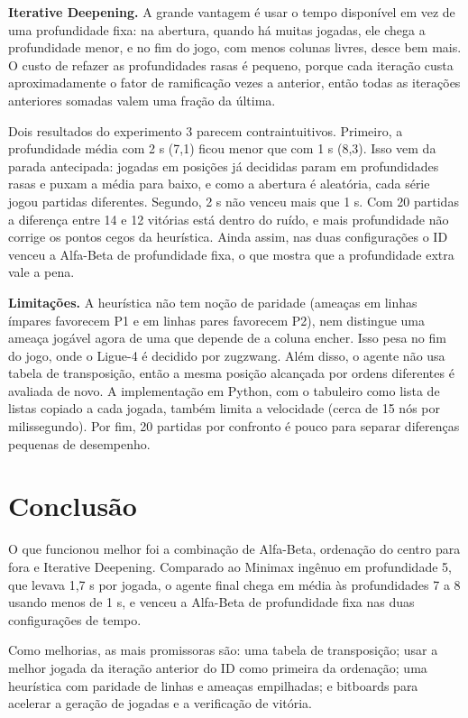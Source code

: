 \documentclass[letterpaper]{article} %
\begin{document}
\textbf{Iterative Deepening.} A grande vantagem é usar o tempo disponível em vez de uma profundidade fixa: na abertura, quando há muitas jogadas, ele chega a profundidade menor, e no fim do jogo, com menos colunas livres, desce bem mais. O custo de refazer as profundidades rasas é pequeno, porque cada iteração custa aproximadamente o fator de ramificação vezes a anterior, então todas as iterações anteriores somadas valem uma fração da última.

Dois resultados do experimento 3 parecem contraintuitivos. Primeiro, a profundidade média com 2 s (7,1) ficou menor que com 1 s (8,3). Isso vem da parada antecipada: jogadas em posições já decididas param em profundidades rasas e puxam a média para baixo, e como a abertura é aleatória, cada série jogou partidas diferentes. Segundo, 2 s não venceu mais que 1 s. Com 20 partidas a diferença entre 14 e 12 vitórias está dentro do ruído, e mais profundidade não corrige os pontos cegos da heurística. Ainda assim, nas duas configurações o ID venceu a Alfa-Beta de profundidade fixa, o que mostra que a profundidade extra vale a pena.

\textbf{Limitações.} A heurística não tem noção de paridade (ameaças em linhas ímpares favorecem P1 e em linhas pares favorecem P2), nem distingue uma ameaça jogável agora de uma que depende de a coluna encher. Isso pesa no fim do jogo, onde o Ligue-4 é decidido por zugzwang. Além disso, o agente não usa tabela de transposição, então a mesma posição alcançada por ordens diferentes é avaliada de novo. A implementação em Python, com o tabuleiro como lista de listas copiado a cada jogada, também limita a velocidade (cerca de 15 nós por milissegundo). Por fim, 20 partidas por confronto é pouco para separar diferenças pequenas de desempenho.

\section{Conclusão}
O que funcionou melhor foi a combinação de Alfa-Beta, ordenação do centro para fora e Iterative Deepening. Comparado ao Minimax ingênuo em profundidade 5, que levava 1,7 s por jogada, o agente final chega em média às profundidades 7 a 8 usando menos de 1 s, e venceu a Alfa-Beta de profundidade fixa nas duas configurações de tempo.

Como melhorias, as mais promissoras são: uma tabela de transposição; usar a melhor jogada da iteração anterior do ID como primeira da ordenação; uma heurística com paridade de linhas e ameaças empilhadas; e bitboards para acelerar a geração de jogadas e a verificação de vitória.
\end{document}
